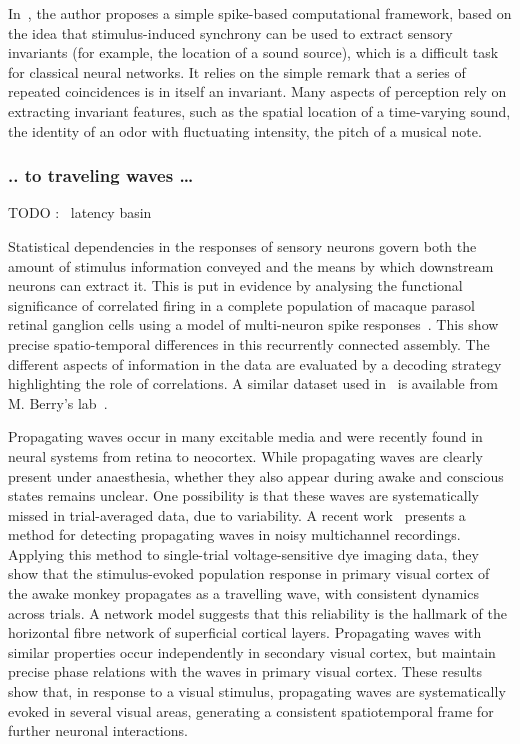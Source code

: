 \documentclass[brainsci, %
               review,submit,pdftex,moreauthors]{Definitions/mdpi}
\begin{document}
In~\citep{brette_computing_2012}, the author proposes a simple spike-based computational framework, based on the idea that stimulus-induced synchrony can be used to extract sensory invariants (for example, the location of a sound source), which is a difficult task for classical neural networks. It relies on the simple remark that a series of repeated coincidences is in itself an invariant. Many aspects of perception rely on extracting invariant features, such as the spatial location of a time-varying sound, the identity of an odor with fluctuating intensity, the pitch of a musical note.

\subsubsection{.. to traveling waves \ldots{}}\label{to-traveling-waves}
TODO :~\citep{bringuier_horizontal_1999} latency basin

Statistical dependencies in the responses of sensory neurons govern both the amount of stimulus information conveyed and the means by which downstream neurons can extract it. This is put in evidence by analysing the functional significance of correlated firing in a complete population of macaque parasol retinal ganglion cells using a model of multi-neuron spike responses~\citep{pillow_spatio-temporal_2008}. This show precise spatio-temporal differences in this recurrently connected assembly. The different aspects of information in the data are evaluated by a decoding strategy highlighting the role of correlations. A similar dataset used in~\citep{schneidman_weak_2006} is available from M. Berry's lab~\citep{berry_spike_2022}.

Propagating waves occur in many excitable media and were recently found in neural systems from retina to neocortex. While propagating waves are clearly present under anaesthesia, whether they also appear during awake and conscious states remains unclear. One possibility is that these waves are systematically missed in trial-averaged data, due to variability. A recent work~\citep{muller_stimulus-evoked_2014} presents a method for detecting propagating waves in noisy multichannel recordings. Applying this method to single-trial voltage-sensitive dye imaging data, they show that the stimulus-evoked population response in primary visual cortex of the awake monkey propagates as a travelling wave, with consistent dynamics across trials. A network model suggests that this reliability is the hallmark of the horizontal fibre network of superficial cortical layers. Propagating waves with similar properties occur independently in secondary visual cortex, but maintain precise phase relations with the waves in primary visual cortex. These results show that, in response to a visual stimulus, propagating waves are systematically evoked in several visual areas, generating a consistent spatiotemporal frame for further neuronal interactions.
\end{document}
